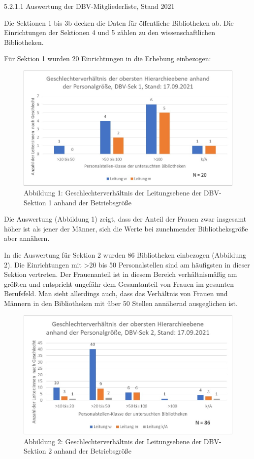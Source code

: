 \documentclass[a4paper,
fontsize=11pt,
oneside,
numbers=noperiodatend,
parskip=half-,
bibliography=totoc,
final
]{scrartcl}
\begin{document}
5.2.1.1 Auswertung der DBV-Mitgliederliste, Stand 2021

Die Sektionen 1 bis 3b decken die Daten für öffentliche Bibliotheken ab.
Die Einrichtungen der Sektionen 4 und 5 zählen zu den wissenschaftlichen
Bibliotheken.

Für Sektion 1 wurden 20 Einrichtungen in die Erhebung einbezogen:

\begin{figure}
\centering
\includegraphics{img/Abb_01_DBV-Sek1.jpg}
\caption{Abbildung 1: Geschlechterverhältnis der Leitungsebene der
DBV-Sektion 1 anhand der Betriebsgröße}
\end{figure}

Die Auswertung (Abbildung 1) zeigt, dass der Anteil der Frauen zwar
insgesamt höher ist als jener der Männer, sich die Werte bei zunehmender
Bibliotheksgröße aber annähern.

In die Auswertung für Sektion 2 wurden 86 Bibliotheken einbezogen
(Abbildung 2). Die Einrichtungen mit \textgreater20 bis 50
Personalstellen sind am häufigsten in dieser Sektion vertreten. Der
Frauenanteil ist in diesem Bereich verhältnismäßig am größten und
entspricht ungefähr dem Gesamtanteil von Frauen im gesamten Berufsfeld.
Man sieht allerdings auch, dass das Verhältnis von Frauen und Männern in
den Bibliotheken mit über 50 Stellen annähernd ausgeglichen ist.

\begin{figure}
\centering
\includegraphics{img/Abb_02_DBV-Sek2.jpg}
\caption{Abbildung 2: Geschlechterverhältnis der Leitungsebene der
DBV-Sektion 2 anhand der Betriebsgröße}
\end{figure}
\end{document}
